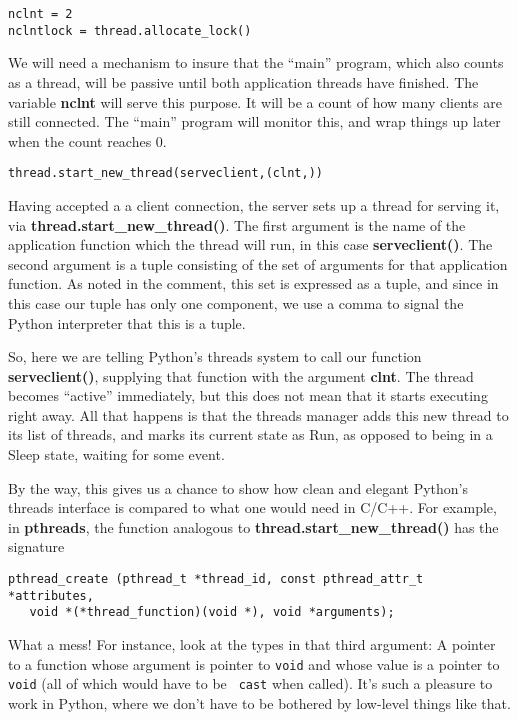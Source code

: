 \begin{Verbatim}[fontsize=\relsize{-2}]
nclnt = 2
nclntlock = thread.allocate_lock()  
\end{Verbatim}

We will need a mechanism to insure that the ``main'' program, which also
counts as a thread, will be passive until both application threads have
finished.  The variable {\bf nclnt} will serve this purpose.  It will be
a count of how many clients are still connected.  The ``main'' program
will monitor this, and wrap things up later when the count reaches 0. 

\begin{Verbatim}[fontsize=\relsize{-2}]
thread.start_new_thread(serveclient,(clnt,))
\end{Verbatim}

Having accepted a a client connection, the server sets up a thread for
serving it, via {\bf thread.start\_new\_thread()}.  The first argument
is the name of the application function which the thread will run, in
this case {\bf serveclient()}.  The second argument is a tuple
consisting of the set of arguments for that application function.  As
noted in the comment, this set is expressed as a tuple, and since in
this case our tuple has only one component, we use a comma to signal the
Python interpreter that this is a tuple.

So, here we are telling Python's threads system to call our function
{\bf serveclient()}, supplying that function with the argument {\bf
clnt}.  The thread becomes ``active'' immediately, but this does not
mean that it starts executing right away.  All that happens is that the
threads manager adds this new thread to its list of threads, and marks
its current state as Run, as opposed to being in a Sleep state, waiting
for some event. 

By the way, this gives us a chance to show how clean and elegant
Python's threads interface is compared to what one would need in C/C++.
For example, in {\bf pthreads}, the function analogous to 
{\bf thread.start\_new\_thread()} has the signature

\begin{Verbatim}[fontsize=\relsize{-2}]
pthread_create (pthread_t *thread_id, const pthread_attr_t *attributes,
   void *(*thread_function)(void *), void *arguments);
\end{Verbatim}

What a mess!  For instance, look at the types in that third argument:  A
pointer to a function whose argument is pointer to {\tt void} and whose
value is a pointer to {\tt void} (all of which would have to be {\tt
cast} when called).  It's such a pleasure to work in Python, where we
don't have to be bothered by low-level things like that.

